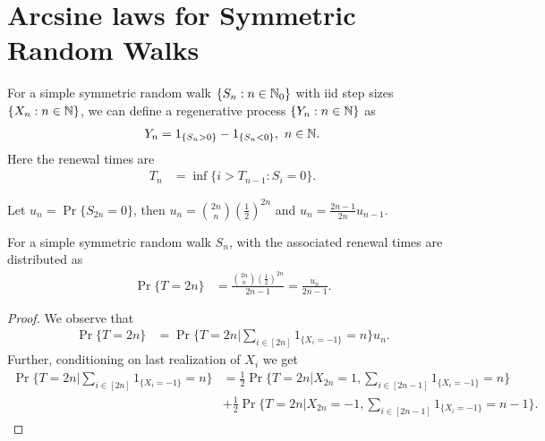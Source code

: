 \documentclass[a4paper,10pt,english]{article}
\begin{document}
\section{Arcsine laws for Symmetric Random Walks}
\begin{defn} For a simple symmetric random walk $\{S_n: n \in \mathbb{N}_0\}$ with iid step sizes $\{X_n: n \in \mathbb{N}\}$, we can define a regenerative process $\{Y_n: n \in \mathbb{N}\}$ as 
\begin{align*}
Y_n = 1_{\{S_n > 0\}} - 1_{\{S_n < 0\}},~n \in \mathbb{N}.
\end{align*}
Here the renewal times are 
\begin{align*}
T_n &= \inf\{ i > T_{n-1}: S_i = 0\}.
\end{align*}
\end{defn}
\begin{rem} Let $u_n = \Pr\{S_{2n} = 0\}$, then $u_n = \binom{2n}{n}\left(\frac{1}{2}\right)^{2n}$ and $u_n = \frac{2n-1}{2n}u_{n-1}$.
\end{rem}
\begin{lem} For a simple symmetric random walk $S_n$, with the associated renewal times are distributed as 
\begin{align*}
\Pr\{T = 2n\} &= \frac{\binom{2n}{n}\left(\frac{1}{2}\right)^{2n}}{2n-1} = \frac{u_n}{2n-1}.
\end{align*}
\end{lem}
\begin{proof} We observe that 
\begin{align*}
\Pr\{T = 2n\} &= \Pr\{T = 2n | \sum_{i \in [2n]}1_{\{ X_i = -1\}} = n\}u_n.
\end{align*}
Further, conditioning on last realization of $X_i$ we get
\begin{align*}
\Pr\{T = 2n |  \sum_{i \in [2n]}1_{\{ X_i = -1\}} = n\} &= \frac{1}{2}\Pr\{T = 2n | X_{2n} = 1,  \sum_{i \in [2n-1]}1_{\{ X_i = -1\}} = n\} \\
&+ \frac{1}{2}\Pr\{T = 2n | X_{2n} = -1,  \sum_{i \in [2n-1]}1_{\{ X_i = -1\}} = n-1 \}.
\end{align*}
\end{proof}
\end{document}

